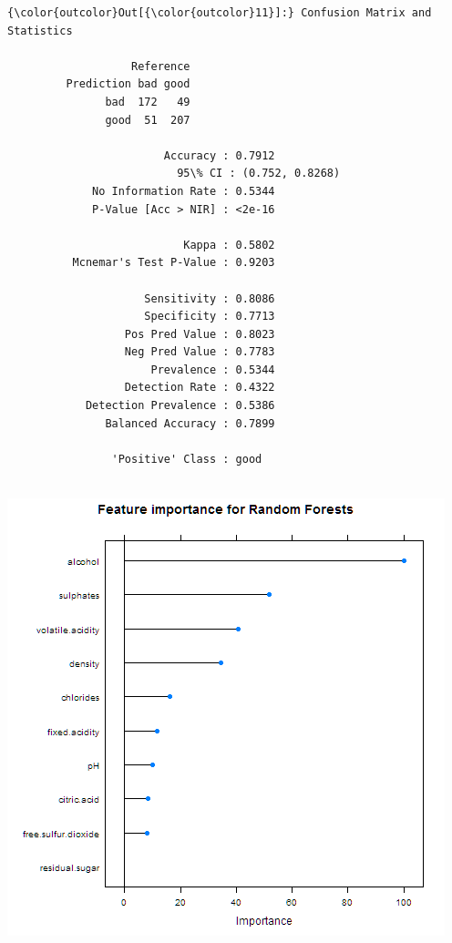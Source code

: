 \documentclass{article}
\begin{document}
            \begin{Verbatim}[commandchars=\\\{\}]
{\color{outcolor}Out[{\color{outcolor}11}]:} Confusion Matrix and Statistics
         
                   Reference
         Prediction bad good
               bad  172   49
               good  51  207
                                                  
                        Accuracy : 0.7912         
                          95\% CI : (0.752, 0.8268)
             No Information Rate : 0.5344         
             P-Value [Acc > NIR] : <2e-16         
                                                  
                           Kappa : 0.5802         
          Mcnemar's Test P-Value : 0.9203         
                                                  
                     Sensitivity : 0.8086         
                     Specificity : 0.7713         
                  Pos Pred Value : 0.8023         
                  Neg Pred Value : 0.7783         
                      Prevalence : 0.5344         
                  Detection Rate : 0.4322         
            Detection Prevalence : 0.5386         
               Balanced Accuracy : 0.7899         
                                                  
                'Positive' Class : good           
                                                  
\end{Verbatim}

\includegraphics[scale=0.9]{2015-12-03-importance-rf}
\end{document}
